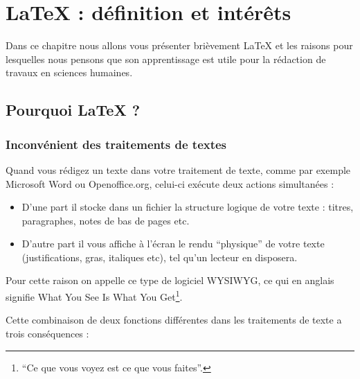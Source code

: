\chapter{\LaTeX{} : définition et intérêts}

\begin{prealable}
 Dans ce chapitre nous allons vous présenter brièvement \LaTeX{} et les raisons pour lesquelles nous pensons que son apprentissage est utile pour la rédaction de travaux en sciences humaines.
\end{prealable}

\section{Pourquoi \LaTeX{} ?}

\subsection{Inconvénient des traitements de textes}

Quand vous rédigez un texte dans votre traitement de texte, comme par exemple Microsoft Word ou Openoffice.org, celui-ci exécute deux actions simultanées :

\begin{itemize}
\item D'une part il stocke dans un fichier la structure logique de votre texte : titres, paragraphes, notes de bas de pages etc.
\item D'autre part il vous affiche à l'écran le rendu \enquote{physique} de votre texte (justifications, gras, italiques etc), tel qu'un lecteur en disposera.
\end{itemize}

Pour cette raison on appelle ce type de logiciel WYSIWYG, ce qui en anglais signifie \textenglish{What You See Is What You Get}\footnote{\enquote{Ce que vous voyez est ce que vous faites}.}. 

Cette combinaison de deux fonctions différentes dans les  traitements de texte a trois conséquences :

